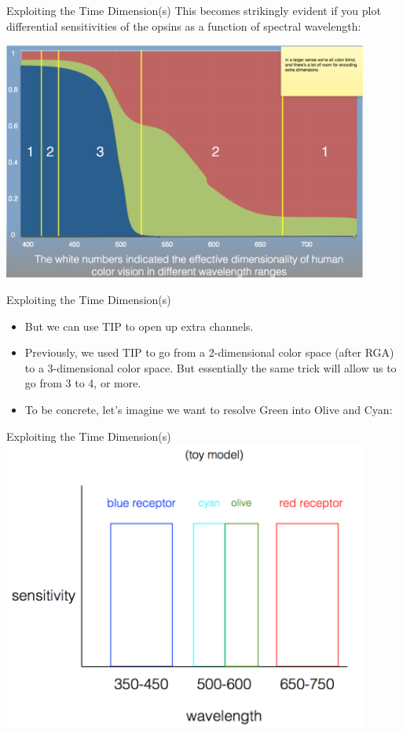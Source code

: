 \documentclass{beamer}
\begin{document}
\begin{frame}{Exploiting the Time Dimension(s)}
   This becomes strikingly evident if you plot differential sensitivities of the opsins as a function of spectral wavelength:
   \begin{center}
      \includegraphics[width=0.9\textwidth]{figures/spectralsensativity.png}
   \end{center}
\end{frame}

\begin{frame}{Exploiting the Time Dimension(s)}
   \begin{itemize}
      \item But we can use TIP to open up extra channels.
      \item Previously, we used TIP to go from a 2-dimensional color space (after RGA) to a 3-dimensional color space. But essentially the same trick will allow us to go from 3 to 4, or more.
      \item To be concrete, let's imagine we want to resolve Green into Olive and Cyan:
   \end{itemize}
\end{frame}

\begin{frame}{Exploiting the Time Dimension(s)}
   \includegraphics[width=0.9\textwidth]{figures/cyanolive.png}
\end{frame}
\end{document}
